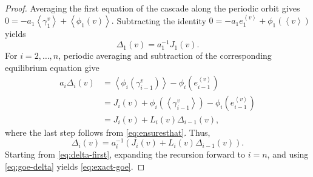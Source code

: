 \documentclass[onecolumn]{IEEEtran}
\newcommand{\avg}[1]{\left\langle #1\right\rangle}
\begin{document}
\begin{proof}
Averaging the first equation of the cascade along the periodic orbit gives
$
    0
    =
    -a_1\avg{\gamma_1^v}
    +
    \avg{\phi_1(v)}.
$
Subtracting the identity 
$    0
    =
    -a_1e_1^{\avg {v}}
    +
    \phi_1(\avg {v})
$ yields
\begin{equation}
    \Delta_1(v)
    =a_1^{-1}
    {J_1(v)} .
    \label{eq:delta-first}
\end{equation}
For $i=2,\ldots,n$, periodic averaging and subtraction of the corresponding
equilibrium equation give
\begin{align*}
    a_i\Delta_i(v)
    &=
    \avg{\phi_i(\gamma_{i-1}^v)}
    -
    \phi_i(e_{i-1}^{\avg {v}})
    \nonumber\\
    &=
    J_i(v)
    +
    \phi_i(\avg{\gamma_{i-1}^v})
    -
    \phi_i(e_{i-1}^{\avg {v}})
    \nonumber\\
    &=
    J_i(v)+L_i(v)\Delta_{i-1}(v), 
\end{align*}
where the last step follows from \eqref{eq:ensuresthat}. Thus,  
\begin{equation*}
    \Delta_i(v)
    =a_i^{-1} \left (
    J_i(v)
    +
    L_i(v)\Delta_{i-1}(v) \right).
    \label{eq:delta-recursion2}
\end{equation*}
Starting from \eqref{eq:delta-first}, expanding the recursion forward to
$i=n$, and using \eqref{eq:goe-delta} yields \eqref{eq:exact-goe}.
\end{proof}

 
\end{document}
